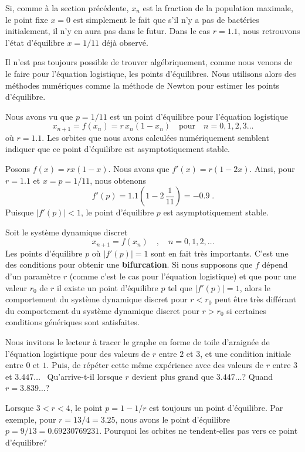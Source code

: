 {Si, comme à la section précédente, $x_n$ est la fraction de la
population maximale, le point fixe $x=0$ est simplement le fait que
s'il n'y a pas de bactéries initialement, il n'y en aura pas dans le
futur.   Dans le cas $r=1.1$, nous retrouvons l'état d'équilibre $x=1/11$
déjà observé.

Il n'est pas toujours possible de trouver algébriquement, comme nous
venons de le faire pour l'équation logistique, les points
d'équilibres.  Nous utilisons alors des méthodes numériques comme la
méthode de Newton pour estimer les points d'équilibre.

\begin{egg}
Nous avons vu que $p= 1/11$ est un point d'équilibre pour l'équation
logistique
\[
x_{n+1} = f(x_n) = r\, x_n (1-x_n) \quad \text{pour} \quad n=0, 1, 2, 3 \ldots
\]
où $r=1.1$.  Les orbites que nous avons calculées numériquement semblent
indiquer que ce point d'équilibre est asymptotiquement stable.

Posons $f(x) = r x (1-x)$.  Nous avons que $f'(x) = r(1-2x)$.  Ainsi, pour
$r=1.1$ et $x = p = 1/11$, nous obtenons
\[
f'(p) = 1.1 \left( 1 - 2\,\frac{1}{11}\right) = -0.9 \; .
\]
Puisque $|f'(p)|<1$, le point d'équilibre $p$ est asymptotiquement
stable.
\end{egg}

\begin{rmk}
Soit le système dynamique discret
\[
x_{n+1} = f(x_n) \quad , \quad n=0, 1, 2, \ldots
\]
Les points d'équilibre $p$ où $|f'(p)|=1$ sont en fait très
importants.  C'est une des conditions pour obtenir une
{\bfseries bifurcation}.  Si nous supposons que $f$ dépend d'un paramètre
$r$ (comme c'est le cas pour l'équation logistique) et que pour une
valeur $r_0$ de $r$ il existe un point d'équilibre $p$ tel que
$|f'(p)|=1$, alors le comportement du système dynamique discret pour
$r<r_0$ peut être très différant du comportement du système dynamique
discret pour $r>r_0$ si certaines conditions génériques sont
satisfaites.

Nous invitons le lecteur à tracer le graphe en forme de toile
d'araignée de l'équation logistique pour des valeurs de $r$ entre $2$
et $3$, et une condition initiale entre $0$ et $1$.  Puis, de répéter
cette même expérience avec des valeurs de $r$ entre $3$ et $3.447\ldots$
\ Qu'arrive-t-il lorsque $r$ devient plus grand que $3.447\ldots$?
Quand $r = 3.839\ldots$?

Lorsque $3<r<4$, le point $p=1-1/r$ est toujours un point
d'équilibre.  Par exemple, pour $r=13/4=3.25$, nous avons le point
d'équilibre $p=9/13=0.69230769231$.  Pourquoi les orbites ne
tendent-elles pas vers ce point d'équilibre?


\end{rmk}}
